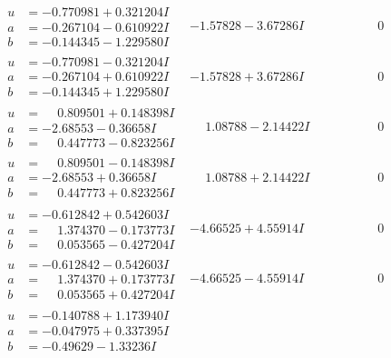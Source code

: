 \documentclass[1p]{elsarticle_modified}
\theoremstyle{definition}
\begin{document}
$$\begin{array}{c|c|c}
 \hline 
\begin{aligned}
u &= -0.770981 + 0.321204 I \\
a &= -0.267104 - 0.610922 I \\
b &= -0.144345 - 1.229580 I\end{aligned}
 & -1.57828 - 3.67286 I & \phantom{-0.000000 } 0 \\ \hline\begin{aligned}
u &= -0.770981 - 0.321204 I \\
a &= -0.267104 + 0.610922 I \\
b &= -0.144345 + 1.229580 I\end{aligned}
 & -1.57828 + 3.67286 I & \phantom{-0.000000 } 0 \\ \hline\begin{aligned}
u &= \phantom{-}0.809501 + 0.148398 I \\
a &= -2.68553 - 0.36658 I \\
b &= \phantom{-}0.447773 - 0.823256 I\end{aligned}
 & \phantom{-}1.08788 - 2.14422 I & \phantom{-0.000000 } 0 \\ \hline\begin{aligned}
u &= \phantom{-}0.809501 - 0.148398 I \\
a &= -2.68553 + 0.36658 I \\
b &= \phantom{-}0.447773 + 0.823256 I\end{aligned}
 & \phantom{-}1.08788 + 2.14422 I & \phantom{-0.000000 } 0 \\ \hline\begin{aligned}
u &= -0.612842 + 0.542603 I \\
a &= \phantom{-}1.374370 - 0.173773 I \\
b &= \phantom{-}0.053565 - 0.427204 I\end{aligned}
 & -4.66525 + 4.55914 I & \phantom{-0.000000 } 0 \\ \hline\begin{aligned}
u &= -0.612842 - 0.542603 I \\
a &= \phantom{-}1.374370 + 0.173773 I \\
b &= \phantom{-}0.053565 + 0.427204 I\end{aligned}
 & -4.66525 - 4.55914 I & \phantom{-0.000000 } 0 \\ \hline\begin{aligned}
u &= -0.140788 + 1.173940 I \\
a &= -0.047975 + 0.337395 I \\
b &= -0.49629 - 1.33236 I\end{aligned}

\end{array}$$
\end{document}
